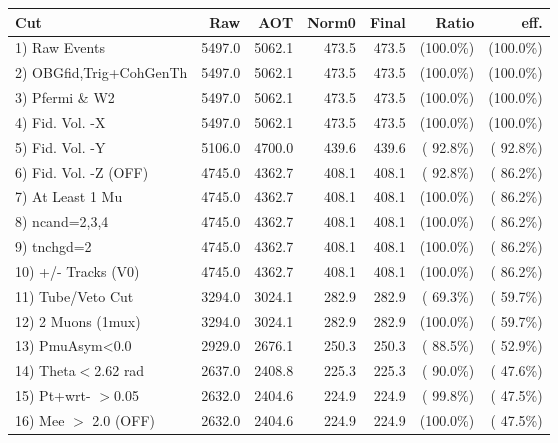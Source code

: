  \begin{table}[h!]\centering
 \begin{tabular}{||l||r|r|r|r|r|r||}
 \hline
 \hline
 Cut & Raw & AOT & Norm0 & Final & Ratio & eff.       \\
 \hline
  1) Raw Events           &       5497.0 &       5062.1 &        473.5 &        473.5 & (100.0\%) & (100.0\%) \\
  2) OBGfid,Trig+CohGenTh &       5497.0 &       5062.1 &        473.5 &        473.5 & (100.0\%) & (100.0\%) \\
  3) Pfermi \& W2         &       5497.0 &       5062.1 &        473.5 &        473.5 & (100.0\%) & (100.0\%) \\
  4) Fid. Vol. -X         &       5497.0 &       5062.1 &        473.5 &        473.5 & (100.0\%) & (100.0\%) \\
  5) Fid. Vol. -Y         &       5106.0 &       4700.0 &        439.6 &        439.6 & ( 92.8\%) & ( 92.8\%) \\
  6) Fid. Vol. -Z (OFF)   &       4745.0 &       4362.7 &        408.1 &        408.1 & ( 92.8\%) & ( 86.2\%) \\
  7) At Least 1 Mu        &       4745.0 &       4362.7 &        408.1 &        408.1 & (100.0\%) & ( 86.2\%) \\
  8) ncand=2,3,4          &       4745.0 &       4362.7 &        408.1 &        408.1 & (100.0\%) & ( 86.2\%) \\
  9) tnchgd=2             &       4745.0 &       4362.7 &        408.1 &        408.1 & (100.0\%) & ( 86.2\%) \\
 10) +/- Tracks (V0)      &       4745.0 &       4362.7 &        408.1 &        408.1 & (100.0\%) & ( 86.2\%) \\
 11) Tube/Veto Cut        &       3294.0 &       3024.1 &        282.9 &        282.9 & ( 69.3\%) & ( 59.7\%) \\
 12) 2 Muons (1mux)       &       3294.0 &       3024.1 &        282.9 &        282.9 & (100.0\%) & ( 59.7\%) \\
 13) PmuAsym<0.0          &       2929.0 &       2676.1 &        250.3 &        250.3 & ( 88.5\%) & ( 52.9\%) \\
 14) Theta$<$2.62 rad     &       2637.0 &       2408.8 &        225.3 &        225.3 & ( 90.0\%) & ( 47.6\%) \\
 15) Pt+wrt- $>$0.05      &       2632.0 &       2404.6 &        224.9 &        224.9 & ( 99.8\%) & ( 47.5\%) \\
 16) Mee $>$ 2.0  (OFF)   &       2632.0 &       2404.6 &        224.9 &        224.9 & (100.0\%) & ( 47.5\%) \\

\end{tabular}
\end{table}

